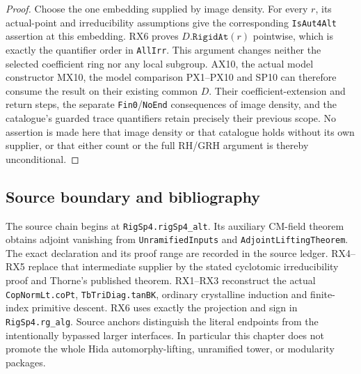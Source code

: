 \begin{proof}
Choose the one embedding supplied by image density.  For every
$r$, its actual-point and irreducibility assumptions give the
corresponding \texttt{IsAut4Alt} assertion at this embedding.
RX6 proves $D.\texttt{RigidAt}(r)$ pointwise, which is exactly
the quantifier order in \texttt{AllIrr}.
This argument changes neither the selected coefficient ring nor
any local subgroup.  AX10, the actual model constructor MX10,
the model comparison PX1--PX10 and SP10 can therefore consume the
result on their existing common $D$.  Their coefficient-extension
and return steps, the separate \texttt{Fin0}/\texttt{NoEnd}
consequences of image density, and the catalogue's guarded trace
quantifiers retain precisely their previous scope.
No assertion is made here that image density or that catalogue
holds without its own supplier, or that either count or the full
RH/GRH argument is thereby unconditional.
\end{proof}

\subsection{Source boundary and bibliography}

The source chain begins at \texttt{RigSp4.\allowbreak rigSp4\_alt}.
Its auxiliary CM-field theorem obtains adjoint vanishing from
\texttt{UnramifiedInputs} and
\texttt{Adjoint\allowbreak Lifting\allowbreak Theorem}.
The exact declaration and its proof range are recorded in the source ledger.
RX4--RX5 replace that intermediate supplier by the stated
cyclotomic irreducibility proof and Thorne's published theorem.
RX1--RX3 reconstruct the actual \texttt{CopNormLt.\allowbreak coPt},
\texttt{TbTriDiag.\allowbreak tanBK}, ordinary crystalline induction and
finite-index primitive descent.  RX6 uses exactly the projection
and sign in \texttt{RigSp4.\allowbreak rg\_alg}.  Source anchors distinguish
the literal endpoints from the intentionally bypassed larger
interfaces.  In particular this chapter does not promote the
whole Hida automorphy-lifting, unramified tower, or modularity
packages.

